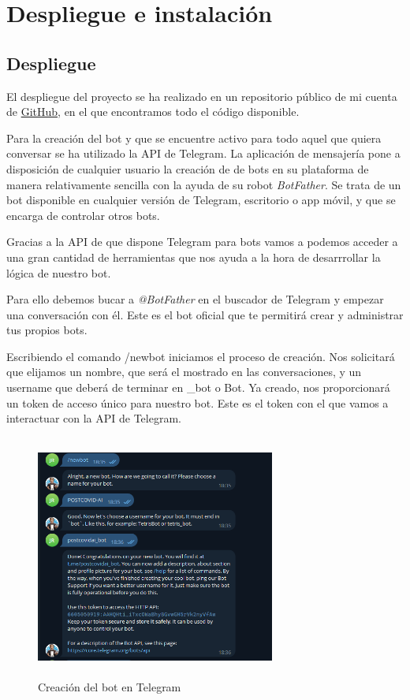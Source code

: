 \chapter{Despliegue e instalación}\vspace{0.3cm}


\section{Despliegue}

El despliegue del proyecto se ha realizado en un repositorio público de mi cuenta de \href{https://github.com/juantiog22}{GitHub}, en el que encontramos todo el código disponible. \vspace{0.3cm}

Para la creación del bot y que se encuentre activo para todo aquel que quiera conversar se ha utilizado la API de Telegram. La aplicación de mensajería pone a disposición de cualquier usuario la creación de de bots en su plataforma de manera relativamente sencilla con la ayuda de su robot \textit{BotFather}. Se trata de un bot disponible en cualquier versión de Telegram, escritorio o app móvil, y que se encarga de controlar otros bots.

Gracias a la API de que dispone Telegram para bots vamos a podemos acceder a una gran cantidad de herramientas que nos ayuda a la hora de desarrrollar la lógica de nuestro bot.


Para ello debemos bucar a \textit{@BotFather} en el buscador de Telegram y empezar una conversación con él. Este es el bot oficial que te permitirá crear y administrar tus propios bots. 

Escribiendo el comando /newbot iniciamos el proceso de creación. Nos solicitará que elijamos un nombre, que será el mostrado en las conversaciones, y un username que deberá de terminar en \_bot o Bot. Ya creado, nos proporcionará un token de acceso único para nuestro bot. Este es el token con el que vamos a interactuar con la API de Telegram. \vspace{2cm}

\begin{figure}[!ht]
    \centering
    \includegraphics[width=0.7\textwidth, height=8cm]{imagenes/bot_creation.png}
    \caption{ Creación del bot en Telegram }
    \label{fig:planificacion}
\end{figure}


